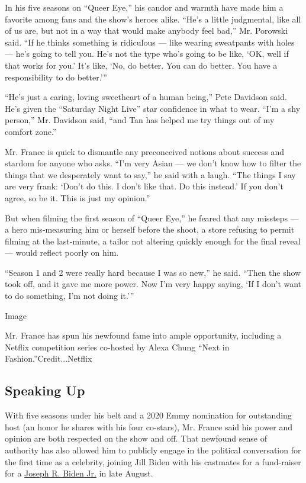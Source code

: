 In his five seasons on ``Queer Eye,'' his candor and warmth have made
him a favorite among fans and the show's heroes alike. ``He's a little
judgmental, like all of us are, but not in a way that would make anybody
feel bad,'' Mr. Porowski said. ``If he thinks something is ridiculous
--- like wearing sweatpants with holes --- he's going to tell you. He's
not the type who's going to be like, `OK, well if that works for you.'
It's like, `No, do better. You can do better. You have a responsibility
to do better.'''

``He's just a caring, loving sweetheart of a human being,'' Pete
Davidson said. He's given the ``Saturday Night Live'' star confidence in
what to wear. ``I'm a shy person,'' Mr. Davidson said, ``and Tan has
helped me try things out of my comfort zone.''

Mr. France is quick to dismantle any preconceived notions about success
and stardom for anyone who asks. ``I'm very Asian --- we don't know how
to filter the things that we desperately want to say,'' he said with a
laugh. ``The things I say are very frank: `Don't do this. I don't like
that. Do this instead.' If you don't agree, so be it. This is just my
opinion.''

But when filming the first season of ``Queer Eye,'' he feared that any
missteps --- a hero mis-measuring him or herself before the shoot, a
store refusing to permit filming at the last-minute, a tailor not
altering quickly enough for the final reveal --- would reflect poorly on
him.

``Season 1 and 2 were really hard because I was so new,'' he said.
``Then the show took off, and it gave me more power. Now I'm very happy
saying, `If I don't want to do something, I'm not doing it.'''

Image

Mr. France has spun his newfound fame into ample opportunity, including
a Netflix competition series co-hosted by Alexa Chung ``Next in
Fashion.''Credit...Netflix

\hypertarget{speaking-up}{%
\subsection{Speaking Up}\label{speaking-up}}

With five seasons under his belt and a 2020 Emmy nomination for
outstanding host (an honor he shares with his four co-stars), Mr. France
said his power and opinion are both respected on the show and off. That
newfound sense of authority has also allowed him to publicly engage in
the political conversation for the first time as a celebrity, joining
Jill Biden with his castmates for a fund-raiser for a
\href{https://www.nytimes3xbfgragh.onion/interactive/2020/us/elections/joe-biden.html}{Joseph
R. Biden Jr.} in late August.

